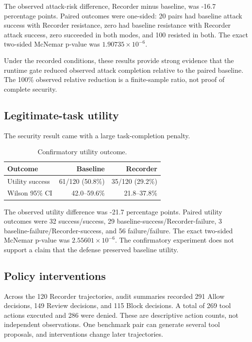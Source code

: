 \documentclass[letterpaper,twocolumn,10pt]{article}
\begin{document}
The observed attack-risk difference, Recorder minus baseline, was -16.7 percentage points. Paired outcomes were one-sided: 20 pairs had baseline attack success with Recorder resistance, zero had baseline resistance with Recorder attack success, zero succeeded in both modes, and 100 resisted in both. The exact two-sided McNemar p-value was $1.90735\times10^{-6}$.

Under the recorded conditions, these results provide strong evidence that the runtime gate reduced observed attack completion relative to the paired baseline. The 100\% observed relative reduction is a finite-sample ratio, not proof of complete security.

\subsection{Legitimate-task utility}
The security result came with a large task-completion penalty.

\begin{table}[t]
\centering
\caption{Confirmatory utility outcome.}
\label{tab:utility}
\begin{tabular}{lrr}
\toprule
Outcome & Baseline & Recorder\\
\midrule
Utility success & 61/120 (50.8\%) & 35/120 (29.2\%)\\
Wilson 95\% CI & 42.0--59.6\% & 21.8--37.8\%\\
\bottomrule
\end{tabular}
\end{table}

The observed utility difference was -21.7 percentage points. Paired utility outcomes were 32 success/success, 29 baseline-success/Recorder-failure, 3 baseline-failure/Recorder-success, and 56 failure/failure. The exact two-sided McNemar p-value was $2.55601\times10^{-6}$. The confirmatory experiment does not support a claim that the defense preserved baseline utility.

\subsection{Policy interventions}
Across the 120 Recorder trajectories, audit summaries recorded 291 Allow decisions, 149 Review decisions, and 115 Block decisions. A total of 269 tool actions executed and 286 were denied. These are descriptive action counts, not independent observations. One benchmark pair can generate several tool proposals, and interventions change later trajectories.
\end{document}
